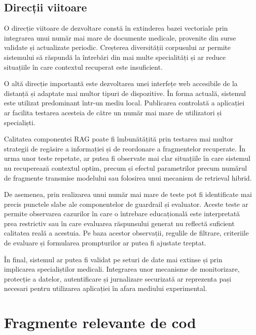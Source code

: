 \documentclass[12pt, a4paper, oneside, romanian]{teza-upb}
\begin{document}
\section{Direcții viitoare}

O direcție viitoare de dezvoltare constă în extinderea bazei vectoriale prin integrarea unui număr mai mare de documente medicale, provenite din surse validate și actualizate periodic. Creșterea diversității corpusului ar permite sistemului să răspundă la întrebări din mai multe specialități și ar reduce situațiile în care contextul recuperat este insuficient.

O altă direcție importantă este dezvoltarea unei interfețe web accesibile de la distanță și adaptate mai multor tipuri de dispozitive. În forma actuală, sistemul este utilizat predominant într-un mediu local. Publicarea controlată a aplicației ar facilita testarea acesteia de către un număr mai mare de utilizatori și specialiști.

Calitatea componentei RAG poate fi îmbunătățită prin testarea mai multor strategii de regăsire a informației și de reordonare a fragmentelor recuperate. În urma unor teste repetate, ar putea fi observate mai clar situațiile în care sistemul nu recuperează contextul optim, precum și efectul parametrilor precum numărul de fragmente transmise modelului sau folosirea unui mecanism de retrieval hibrid.

De asemenea, prin realizarea unui număr mai mare de teste pot fi identificate mai precis punctele slabe ale componentelor de guardrail și evaluator. Aceste teste ar permite observarea cazurilor în care o întrebare educațională este interpretată prea restrictiv sau în care evaluarea răspunsului generat nu reflectă suficient calitatea reală a acestuia. Pe baza acestor observații, regulile de filtrare, criteriile de evaluare și formularea prompturilor ar putea fi ajustate treptat.

În final, sistemul ar putea fi validat pe seturi de date mai extinse și prin implicarea specialiștilor medicali. Integrarea unor mecanisme de monitorizare, protecție a datelor, autentificare și jurnalizare securizată ar reprezenta pași necesari pentru utilizarea aplicației în afara mediului experimental.




\appendix
\chapter{Fragmente relevante de cod}
\end{document}
